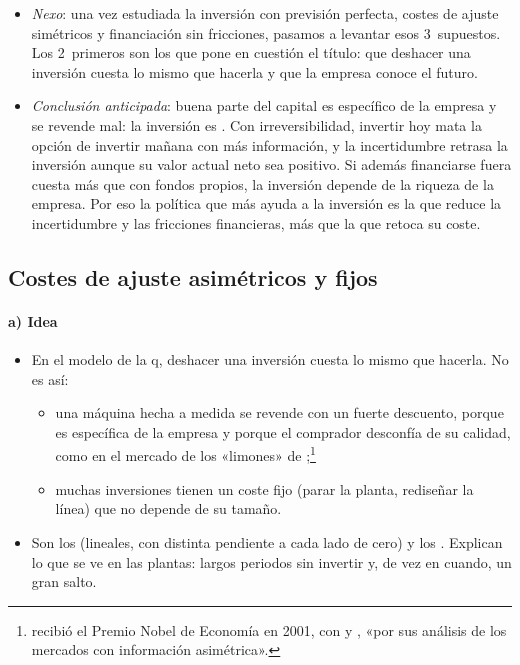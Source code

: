 \documentclass[11pt]{article}
\begin{document}
\begin{itemize}
\item \emph{Nexo}: una vez estudiada la inversión con previsión perfecta, costes de ajuste simétricos y financiación sin fricciones, pasamos a levantar esos 3~supuestos. Los 2~primeros son los que pone en cuestión el título: que deshacer una inversión cuesta lo mismo que hacerla y que la empresa conoce el futuro.
\item \emph{Conclusión anticipada}: buena parte del capital es específico de la empresa y se revende mal: la inversión es . Con irreversibilidad, invertir hoy mata la opción de invertir mañana con más información, y la incertidumbre retrasa la inversión aunque su valor actual neto sea positivo. Si además financiarse fuera cuesta más que con fondos propios, la inversión depende de la riqueza de la empresa. Por eso la política que más ayuda a la inversión es la que reduce la incertidumbre y las fricciones financieras, más que la que retoca su coste.
\end{itemize}

\subsection{Costes de ajuste asimétricos y fijos}\label{sec:asimetricos}

\paragraph{a) Idea}

\begin{itemize}
\item En el modelo de la q, deshacer una inversión cuesta lo mismo que hacerla. No es así:
  \begin{itemize}
  \item una máquina hecha a medida se revende con un fuerte descuento, porque es específica de la empresa y porque el comprador desconfía de su calidad, como en el mercado de los «limones» de  ;\footnote{ recibió el Premio Nobel de Economía en 2001, con  y , «por sus análisis de los mercados con información asimétrica»\nocite{Nobel2001AkerlofSpenceStiglitz}.}
  \item muchas inversiones tienen un coste fijo (parar la planta, rediseñar la línea) que no depende de su tamaño.
  \end{itemize}
\item Son los  (lineales, con distinta pendiente a cada lado de cero) y los \nocite{Romer2019Advanced}. Explican lo que se ve en las plantas: largos periodos sin invertir y, de vez en cuando, un gran salto.
\end{itemize}
\end{document}
